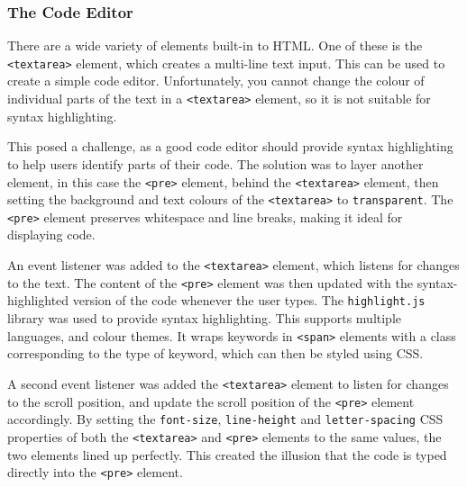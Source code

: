 \documentclass[../main.tex]{subfiles}
\begin{document}
            \subsubsection{The Code Editor}
                There are a wide variety of elements built-in to HTML.
                One of these is the \texttt{<textarea>} element, which creates a multi-line
                    text input.
                This can be used to create a simple code editor.
                Unfortunately, you cannot change the colour of individual parts of the text in
                    a \texttt{<textarea>} element, so it is not suitable for syntax highlighting.

                This posed a challenge, as a good code editor should provide syntax
                    highlighting to help users identify parts of their code.
                The solution was to layer another element, in this case the \texttt{<pre>}
                    element, behind the \texttt{<textarea>} element, then setting the background
                    and text colours of the \texttt{<textarea>} to \texttt{transparent}.
                The \texttt{<pre>} element preserves whitespace and line breaks, making it
                    ideal for displaying code.

                An event listener was added to the \texttt{<textarea>} element, which listens
                    for changes to the text.
                The content of the \texttt{<pre>} element was then updated with the
                    syntax-highlighted version of the code whenever the user types.
                The \texttt{highlight.js} library was used to provide syntax highlighting.
                This supports multiple languages, and colour themes.
                It wraps keywords in \texttt{<span>} elements with a class corresponding to the
                    type of keyword, which can then be styled using CSS.

                A second event listener was added the \texttt{<textarea>} element to listen for
                    changes to the scroll position, and update the scroll position of the
                    \texttt{<pre>} element accordingly.
                By setting the \texttt{font-size}, \texttt{line-height} and
                    \texttt{letter-spacing} CSS properties of both the \texttt{<textarea>} and
                    \texttt{<pre>} elements to the same values, the two elements lined up
                    perfectly.
                This created the illusion that the code is typed directly into the
                    \texttt{<pre>} element.
\end{document}
